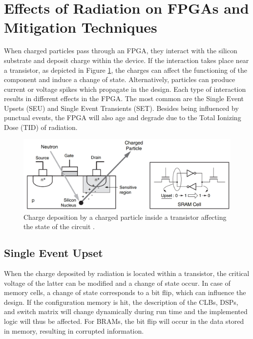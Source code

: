   \section{Effects of Radiation on FPGAs and Mitigation Techniques}

    When charged particles pass through an FPGA, they interact with the silicon substrate and deposit charge within the device. If the interaction takes place near a transistor, as depicted in Figure \ref{fig:II-6-transistor}, the charges can affect the functioning of the component and induce a change of state. Alternatively, particles can produce current or voltage spikes which propagate in the design. Each type of interaction results in different effects in the FPGA. The most common are the Single Event Upsets (SEU) and Single Event Transients (SET). Besides being influenced by punctual events, the FPGA will also age and degrade due to the Total Ionizing Dose (TID) of radiation.

    \begin{figure}[h!]
      \centering
      \includegraphics[width=\textwidth]{img/II-6-irradiation/transistor.png}
      \caption{Charge deposition by a charged particle inside a transistor affecting the state of the circuit \cite{XILINX-RADIATION}.}
      \label{fig:II-6-transistor}
    \end{figure}

    \subsection{Single Event Upset}

      When the charge deposited by radiation is located within a transistor, the critical voltage of the latter can be modified and a change of state occur. In case of memory cells, a change of state corresponds to a bit flip, which can influence the design. If the configuration memory is hit, the description of the CLBs, DSPs, and switch matrix will change dynamically during run time and the implemented logic will thus be affected. For BRAMs, the bit flip will occur in the data stored in memory, resulting in corrupted information. \\

